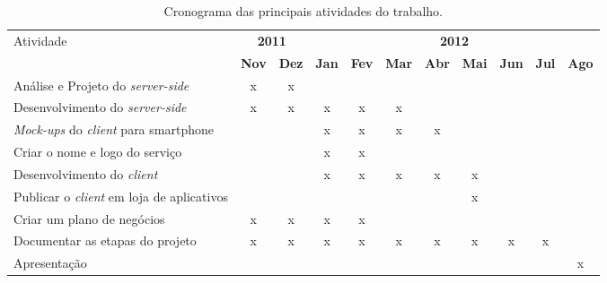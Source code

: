 \documentclass[diss]{template/setrem}
\begin{document}
\begin{table}[!h]
  \begin{center}
  	\footnotesize
  	\renewcommand{\arraystretch}{1.5}
    \begin{tabular}{ | l | c | c | c | c | c | c | c | c | c | c |}
    \hline
	
	\multirow{2}{*}{Atividade} & \multicolumn{2}{|c|}{\textbf{2011}} & \multicolumn{8}{|c|}{\textbf{2012}} \\ \cline{2-11}
	& \textbf{Nov} & \textbf{Dez} & \textbf{Jan} & \textbf{Fev} & \textbf{Mar} & \textbf{Abr} & \textbf{Mai} & \textbf{Jun} & \textbf{Jul} & \textbf{Ago} \\ \hline
	
	\parbox[t]{5cm}{Análise e Projeto do \emph{server-side}} & x & x & & & & & & & & \\ \hline
	
	\parbox[t]{5cm}{Desenvolvimento do \emph{server-side}} & x & x & x & x & x & & & & & \\ \hline
	
	\parbox[t]{5cm}{\emph{Mock-ups} do \emph{client} para smartphone} & & & x & x & x & x & & & & \\ \hline
	
	\parbox[t]{5cm}{Criar o nome e logo do serviço} & & & x & x & & & & & & \\ \hline
	
	\parbox[t]{5cm}{Desenvolvimento do \emph{client}} & & & x & x & x & x & x & & & \\ \hline
	
	\parbox[t]{5cm}{Publicar o \emph{client} em loja de aplicativos} & & & & & & & x & & & \\ \hline
	
	\parbox[t]{5cm}{Criar um plano de negócios} & x & x & x & x & & & & & & \\ \hline
	
	\parbox[t]{5cm}{Documentar as etapas do projeto} & x & x & x & x & x & x & x & x & x & \\ \hline
	
	\parbox[t]{5cm}{Apresentação} & & & & & & & & & & x \\ \hline
	
    \hline
    \end{tabular}
  \end{center}
  \caption{Cronograma das principais atividades do trabalho.}
  \label{tab:patterns}
\end{table}
\end{document}
